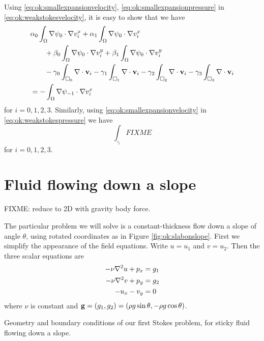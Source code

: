 Using \eqref{eq:ok:smallexpansionvelocity}, \eqref{eq:ok:smallexpansionpressure} in \eqref{eq:ok:weakstokesvelocity}, it is easy to show that we have
\begin{align}
&\alpha_0 \int_\Omega \nabla \psi_0 \cdot \nabla v_i^x + \alpha_1 \int_\Omega \nabla \psi_0 \cdot \nabla v_i^x \label{eq:ok:smallconcretevelocity} \\
&\qquad + \beta_0 \int_\Omega \nabla \psi_0 \cdot \nabla v_i^y + \beta_1 \int_\Omega \nabla \psi_0 \cdot \nabla v_i^y \notag \\
&\qquad - \gamma_0 \int_{\square_0} \nabla\cdot \mathbf{v}_i - \gamma_1 \int_{\square_1} \nabla\cdot \mathbf{v}_i - \gamma_2 \int_{\square_2} \nabla\cdot \mathbf{v}_i - \gamma_3 \int_{\square_3} \nabla\cdot \mathbf{v}_i \notag \\
&= - \int_\Omega \nabla \psi_{-1} \cdot \nabla v_i^x \notag
\end{align}
for $i=0,1,2,3$.  Similarly, using \eqref{eq:ok:smallexpansionvelocity} in \eqref{eq:ok:weakstokespressure} we have
\begin{equation}
\int_{\square_i} FIXME \label{eq:ok:smallconcretepressure} 
\end{equation}
for $i=0,1,2,3$.


\section{Fluid flowing down a slope}

FIXME: reduce to 2D with gravity body force.

The particular problem we will solve is a constant-thickness flow down a slope of angle $\theta$, using rotated coordinates as in Figure \ref{fig:ok:slabonslope}.  First we simplify the appearance of the field equations.  Write $u=u_1$ and $v=u_2$.  Then the three scalar equations are
\begin{align}
-\nu \nabla^2 u + p_x &= g_1 \label{eq:ok:stokes2du} \\
-\nu \nabla^2 v + p_y &= g_2 \label{eq:ok:stokes2dv} \\
- u_x - v_y &= 0 \label{eq:ok:stokes2dincomp}
\end{align}
where $\nu$ is constant and $\mathbf{g} = (g_1,g_2) = (\rho g \sin \theta, - \rho g \cos \theta)$.

\begin{marginfigure}

\caption{Geometry and boundary conditions of our first Stokes problem, for sticky fluid flowing down a slope.}
\label{fig:ok:slabonslope}
\end{marginfigure}

